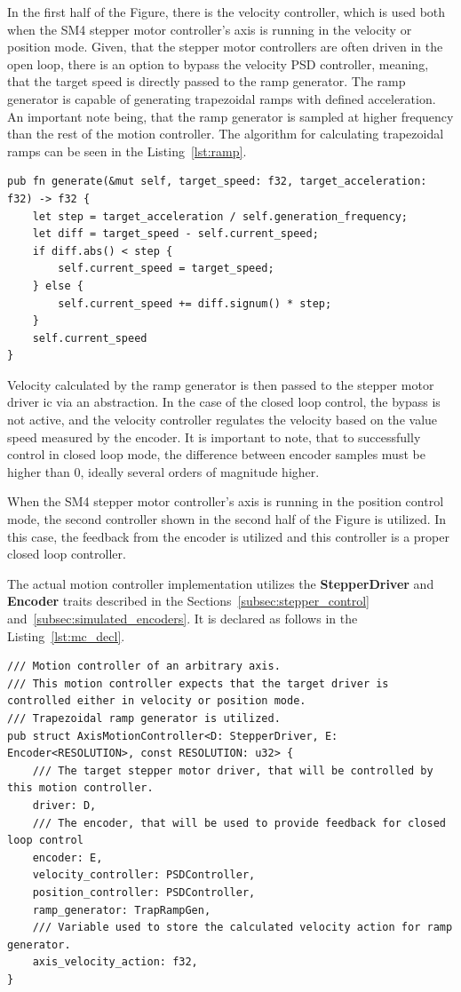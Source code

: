 In the first half of the Figure, there is the velocity controller, which is used both when the SM4 stepper motor controller's axis is running in the velocity or position mode.
Given, that the stepper motor controllers are often driven in the open loop, there is an option to bypass the velocity PSD controller, meaning, that the target speed is directly passed to the ramp generator.
The ramp generator is capable of generating trapezoidal ramps with defined acceleration.
An important note being, that the ramp generator is sampled at higher frequency than the rest of the motion controller.
The algorithm for calculating trapezoidal ramps can be seen in the Listing~\ref{lst:ramp}.
\begin{lstlisting}[caption={Calculating trapezoidal ramps.},label=lst:ramp]
pub fn generate(&mut self, target_speed: f32, target_acceleration: f32) -> f32 {
    let step = target_acceleration / self.generation_frequency;
    let diff = target_speed - self.current_speed;
    if diff.abs() < step {
        self.current_speed = target_speed;
    } else {
        self.current_speed += diff.signum() * step;
    }
    self.current_speed
}
\end{lstlisting}

Velocity calculated by the ramp generator is then passed to the stepper motor driver \acs{ic} via an abstraction.
In the case of the closed loop control, the bypass is not active, and the velocity controller regulates the velocity based on the value speed measured by the encoder.
It is important to note, that to successfully control in closed loop mode, the difference between encoder samples must be higher than 0, ideally several orders of magnitude higher.

When the SM4 stepper motor controller's axis is running in the position control mode, the second controller shown in the second half of the Figure is utilized.
In this case, the feedback from the encoder is utilized and this controller is a proper closed loop controller.

The actual motion controller implementation utilizes the \textbf{StepperDriver} and \textbf{Encoder} traits described in the Sections~\ref{subsec:stepper_control} and~\ref{subsec:simulated_encoders}.
It is declared as follows in the Listing~\ref{lst:mc_decl}.
\begin{lstlisting}[caption={Implementation of the PSD controller with integrator.},label=lst:mc_decl]
/// Motion controller of an arbitrary axis.
/// This motion controller expects that the target driver is controlled either in velocity or position mode.
/// Trapezoidal ramp generator is utilized.
pub struct AxisMotionController<D: StepperDriver, E: Encoder<RESOLUTION>, const RESOLUTION: u32> {
    /// The target stepper motor driver, that will be controlled by this motion controller.
    driver: D,
    /// The encoder, that will be used to provide feedback for closed loop control
    encoder: E,
    velocity_controller: PSDController,
    position_controller: PSDController,
    ramp_generator: TrapRampGen,
    /// Variable used to store the calculated velocity action for ramp generator.
    axis_velocity_action: f32,
}
\end{lstlisting}

